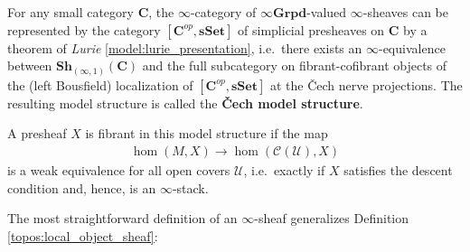     \begin{property}\label{topos:cech_model_structure}
        For any small category $\mathbf{C}$, the $\infty$-category of $\infty\mathbf{Grpd}$-valued $\infty$-sheaves can be represented by the category $[\mathbf{C}^{op},\mathbf{sSet}]$ of simplicial presheaves on $\mathbf{C}$ by a theorem of \textit{Lurie} \ref{model:lurie_presentation}, i.e.~there exists an $\infty$-equivalence between $\mathbf{Sh}_{(\infty,1)}(\mathbf{C})$ and the full subcategory on fibrant-cofibrant objects of the (left Bousfield) localization of $[\mathbf{C}^{op},\mathbf{sSet}]$ at the \v{C}ech nerve projections. The resulting model structure is called the \textbf{\v{C}ech model structure}.

        A presheaf $X$ is fibrant in this model structure if the map
        \begin{gather}
            \hom(M,X)\rightarrow\hom(\mathcal{C}(\mathcal{U}),X)
        \end{gather}
        is a weak equivalence for all open covers $\mathcal{U}$, i.e.~exactly if $X$ satisfies the descent condition and, hence, is an $\infty$-stack.
    \end{property}

    The most straightforward definition of an $\infty$-sheaf generalizes Definition \ref{topos:local_object_sheaf}:

